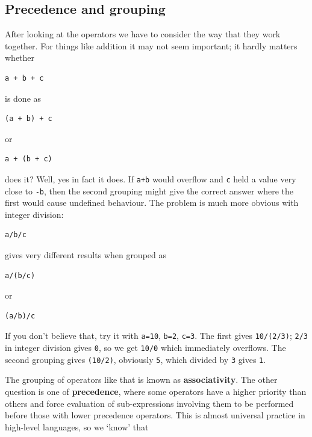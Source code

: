    

  

  \subsection{Precedence and grouping}
   

   After looking at the operators we have to consider the way that they
    work together. For things like addition it may not seem important; it
    hardly matters whether


   \begin{Verbatim}
a + b + c
\end{Verbatim}

   is done as


   \begin{Verbatim}
(a + b) + c
\end{Verbatim}

   or


   \begin{Verbatim}
a + (b + c)
\end{Verbatim}

   does it? Well, yes in fact it does. If \texttt{a+b} would
    overflow and \texttt{c} held a value very close
    to \texttt{-b}, then the second grouping might give the correct
    answer where the first would cause undefined behaviour. The problem is
    much more obvious with integer division:


   \begin{Verbatim}
a/b/c
\end{Verbatim}

   gives very different results when grouped as


   \begin{Verbatim}
a/(b/c)
\end{Verbatim}

   or


   \begin{Verbatim}
(a/b)/c
\end{Verbatim}

   If you don't believe that, try it with \texttt{a=10},
    \texttt{b=2}, \texttt{c=3}. The first
    gives \texttt{10/(2/3)}; \texttt{2/3} in integer
    division gives \texttt{0}, so we get \texttt{10/0} which
    immediately overflows. The second grouping gives \texttt{(10/2)},
    obviously \texttt{5}, which divided by \texttt{3}
    gives \texttt{1}.


   The grouping of operators like that is known as
    \textbf{associativity}. The other question is one of
    \textbf{precedence}, where some operators have a higher priority than
    others and force evaluation of sub-expressions involving them to be
    performed before those with lower precedence operators. This is almost
    universal practice in high-level languages, so we `know' that


